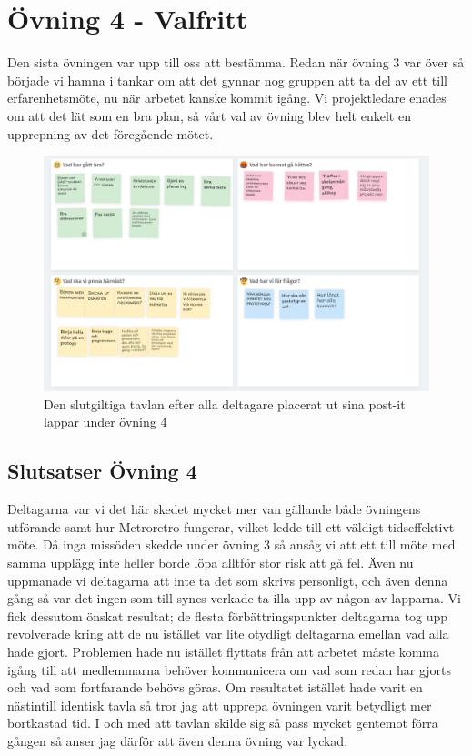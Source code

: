 \documentclass[a4paper, titlepage,12pt]{article}
\begin{document}
	\section{Övning 4 - Valfritt}

		Den sista övningen var upp till oss att bestämma. Redan när övning 3 var över så började vi hamna i tankar om att det gynnar nog gruppen att ta del av ett till erfarenhetsmöte, nu när arbetet kanske kommit igång. Vi projektledare enades om att det lät som en bra plan, så vårt val av övning blev helt enkelt en upprepning av det föregående mötet.

		
		\begin{figure}[h!]
			\includegraphics[scale=0.38]{./metroretro-2.png}
			\caption{Den slutgiltiga tavlan efter alla deltagare placerat ut sina post-it lappar under övning 4}
		\end{figure}

		\subsection{Slutsatser Övning 4}
			
			Deltagarna var vi det här skedet mycket mer van gällande både övningens utförande samt hur Metroretro fungerar, vilket ledde till ett väldigt tidseffektivt möte. Då inga missöden skedde under övning 3 så ansåg vi att ett till möte med samma upplägg inte heller borde löpa alltför stor risk att gå fel. Även nu uppmanade vi deltagarna att inte ta det som skrivs personligt, och även denna gång så var det ingen som till synes verkade ta illa upp av någon av lapparna. Vi fick dessutom önskat resultat; de flesta förbättringspunkter deltagarna tog upp revolverade kring att de nu istället var lite otydligt deltagarna emellan vad alla hade gjort. Problemen hade nu istället flyttats från att arbetet måste komma igång till att medlemmarna behöver kommunicera om vad som redan har gjorts och vad som fortfarande behövs göras. Om resultatet istället hade varit en nästintill identisk tavla så tror jag att upprepa övningen varit betydligt mer bortkastad tid. I och med att tavlan skilde sig så pass mycket gentemot förra gången så anser jag därför att även denna övning var lyckad.

	\newpage
	\printbibliography
\end{document}
